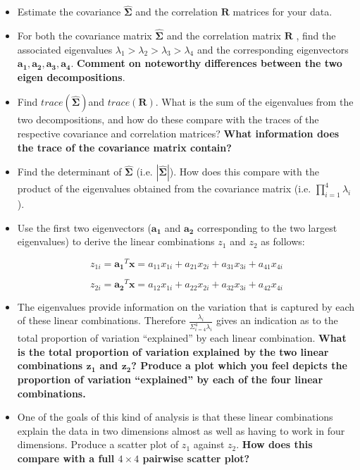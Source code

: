 \documentclass[11pt]{article}
\begin{document}
\begin{itemize}
\item Estimate the covariance $\boldsymbol{\hat{\Sigma}}$ and the correlation $\boldsymbol{R}$ matrices for your data.

\item For both the covariance matrix $\boldsymbol{\hat{\Sigma}}$ and the correlation matrix $\boldsymbol{R}$ , find the associated eigenvalues $\lambda_{1} > \lambda_{2} > \lambda_{3}  > \lambda_{4}$ and the corresponding eigenvectors $\boldsymbol{a_{1}}, \boldsymbol{a_{2}}, \boldsymbol{a_{3}}, \boldsymbol{a_{4}}$.  \textbf{Comment on noteworthy differences between the two eigen decompositions}.

\item Find $trace(\boldsymbol{\hat{\Sigma}})$and $trace(\boldsymbol{R})$.   What is the sum of the eigenvalues from the two decompositions, and how do these compare with the traces of the respective covariance and correlation matrices?   \textbf{What information does the trace of the covariance matrix contain?}


\item Find the determinant of $\boldsymbol{\hat{\Sigma}}$  (i.e. $|\boldsymbol{\hat{\Sigma}}|$).   How does this compare with the product of the eigenvalues obtained from the covariance matrix (i.e. $\prod_{i=1}^{4} \lambda_{i}$).

\item Use the first two eigenvectors ($\boldsymbol{a_{1}}$ and $\boldsymbol{a_{2}}$ corresponding to the two largest eigenvalues) to derive the linear combinations $z_{1}$ and $z_{2}$ as follows:

\begin{displaymath}
z_{1i} = \boldsymbol{a_{1}}^{T}\boldsymbol{x} = a_{11}x_{1i} + a_{21}x_{2i} + a_{31}x_{3i} + a_{41}x_{4i}  
\end{displaymath}

\begin{displaymath}
z_{2i} = \boldsymbol{a_{2}}^{T}\boldsymbol{x} = a_{12}x_{1i} + a_{22}x_{2i} + a_{32}x_{3i} + a_{42}x_{4i} 
\end{displaymath}

\item The eigenvalues provide information on the variation that is captured by each of these linear combinations.   Therefore $\frac{\lambda_{i}}{\Sigma_{i=4}^{4} \lambda_{i}}$ gives an indication as to the total proportion of variation ``explained'' by each linear combination.   \textbf{What is the total proportion of variation explained by the two linear combinations $\boldsymbol{z_{1}}$ and $\boldsymbol{z_{2}}$?   Produce a plot which you feel depicts the proportion of variation ``explained'' by each of the four linear combinations.}

\item One of the goals of this kind of analysis is that these linear combinations explain the data in two dimensions almost as well as having to work in four dimensions.   Produce a scatter plot of $z_{1}$ against $z_{2}$.   \textbf{How does this compare with a full $4 \times 4$ pairwise scatter plot?}

\end{itemize}
\end{document}
